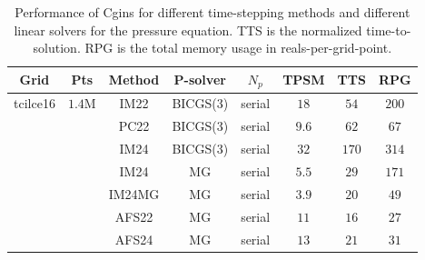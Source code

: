 \begin{table}[hbt]
\begin{center}
\begin{tabular}{|c|c|c|c|c|c|c|c|} \hline 
   Grid          &  Pts     & Method   & P-solver  &   $N_p$  & TPSM     & TTS      &  RPG      \\ \hline
 tcilce16        & $1.4$M   & IM22     &  BICGS(3) &  serial  & $18 $    & $54 $    & $200$     \\ 
                 &          & PC22     &  BICGS(3) &  serial  & $9.6$    & $62 $    & $67 $     \\ 
                 &          & IM24     &  BICGS(3) &  serial  & $32 $    & $170$    & $314$     \\ 
                 &          & IM24     &  MG       &  serial  & $5.5$    & $29 $    & $171$     \\ 
                 &          & IM24MG   &  MG       &  serial  & $3.9$    & $20 $    & $49 $     \\ 
                 &          & AFS22    &  MG       &  serial  & $11 $    & $16 $    & $27 $     \\ 
                 &          & AFS24    &  MG       &  serial  & $13 $    & $21 $    & $31 $     \\ 
\hline 
\end{tabular}
\end{center}
\caption{Performance of Cgins for different time-stepping methods and different linear solvers for the
   pressure equation. TTS is the normalized time-to-solution. 
RPG is the total memory usage in reals-per-grid-point.
}
\label{tab:performanceTcilc16} 
\end{table}


